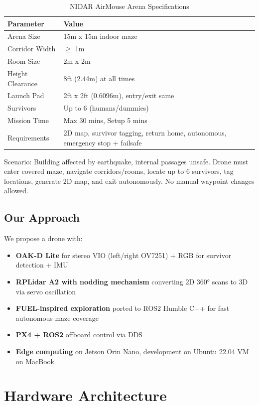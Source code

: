\documentclass[12pt,a4paper]{article}
\begin{document}
\begin{table}[H]
\centering
\begin{tabular}{@{}ll@{}}
\toprule
Parameter & Value \\
\midrule
Arena Size & 15m x 15m indoor maze \\
Corridor Width & $\geq$ 1m \\
Room Size & 2m x 2m \\
Height Clearance & 8ft (2.44m) at all times \\
Launch Pad & 2ft x 2ft (0.6096m), entry/exit same \\
Survivors & Up to 6 (humans/dummies) \\
Mission Time & Max 30 mins, Setup 5 mins \\
Requirements & 2D map, survivor tagging, return home, autonomous, emergency stop + failsafe \\
\bottomrule
\end{tabular}
\caption{NIDAR AirMouse Arena Specifications}
\end{table}

Scenario: Building affected by earthquake, internal passages unsafe. Drone must enter covered maze, navigate corridors/rooms, locate up to 6 survivors, tag locations, generate 2D map, and exit autonomously. No manual waypoint changes allowed.

\subsection{Our Approach}
We propose a drone with:
\begin{itemize}
    \item \textbf{OAK-D Lite} for stereo VIO (left/right OV7251) + RGB for survivor detection + IMU
    \item \textbf{RPLidar A2 with nodding mechanism} converting 2D 360° scans to 3D via servo oscillation
    \item \textbf{FUEL-inspired exploration} ported to ROS2 Humble C++ for fast autonomous maze coverage
    \item \textbf{PX4 + ROS2} offboard control via DDS
    \item \textbf{Edge computing} on Jetson Orin Nano, development on Ubuntu 22.04 VM on MacBook
\end{itemize}

\section{Hardware Architecture}
\end{document}
